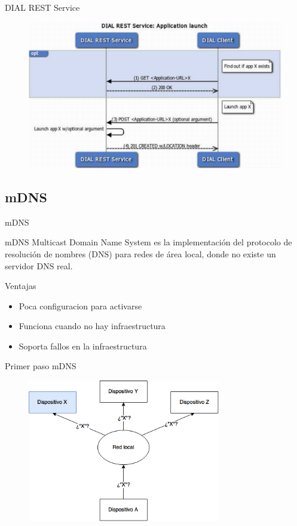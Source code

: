 \begin{frame}{DIAL REST Service}
	\begin{figure}[H]
		\centering
		\includegraphics[width=1\textwidth]{./Imagenes/dialrest.png}
	\end{figure}
\end{frame}

\subsection{mDNS}

\begin{frame}{mDNS}
	\begin{block}{mDNS}
		Multicast Domain Name System es la implementación del protocolo de resolución de nombres (DNS) para redes de área local, donde no existe un servidor DNS real.
	\end{block}

	\begin{block}{Ventajas}
		\begin{itemize}
			\item Poca configuracion para activarse
			\item Funciona cuando no hay infraestructura
			\item Soporta fallos en la infraestructura
		\end{itemize}
	\end{block}
\end{frame}


\begin{frame}{Primer paso mDNS}
	\begin{figure}[H]
		\centering
		\includegraphics[width=0.75\textwidth]{./Imagenes/mdns1.png}
		\label{fig:mdns1}
	\end{figure}
\end{frame}


